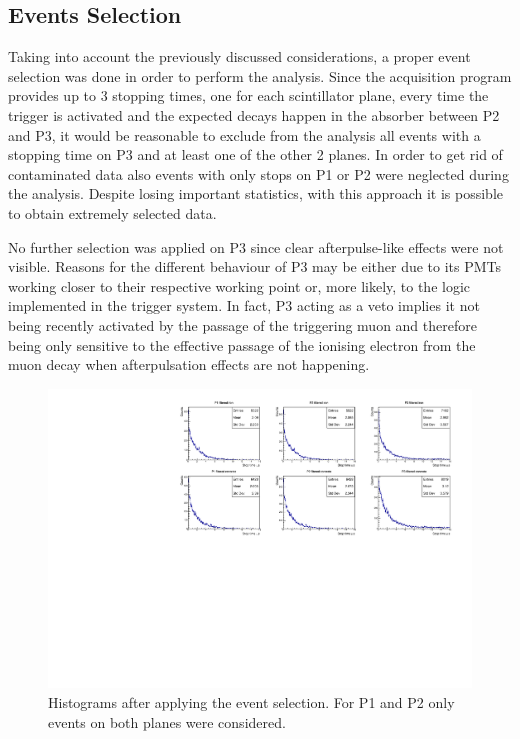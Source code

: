\documentclass[../main.tex]{subfiles}
\begin{document}
\subsection{Events Selection}

Taking into account the previously discussed considerations, a proper event selection was done in order to perform the analysis. Since the acquisition program provides up to 3 stopping times, one for each scintillator plane, every time the trigger is activated and the expected decays happen in the absorber between P2 and P3, it would be reasonable to exclude from the analysis all events with a stopping time on P3 and at least one of the other 2 planes. In order to get rid of contaminated data also events with only stops on P1 or P2 were neglected during the analysis. Despite losing important statistics, with this approach it is possible to obtain extremely selected data. 

No further selection was applied on P3 since clear afterpulse-like effects were not visible. Reasons for the different behaviour of P3 may be either due to its PMTs working closer to their respective working point or, more likely, to the logic implemented in the trigger system. In fact, P3 acting as a veto implies it not being recently activated by the passage of the triggering muon and therefore being only sensitive to the effective passage of the ionising electron from the muon decay when afterpulsation effects are not happening.

\begin{figure}[htb!]
    \centering
    \includegraphics[width=\linewidth]{images/filtered_histograms.pdf}
    \caption{Histograms after applying the event selection. For P1 and P2 only events on both planes were considered.}
    \label{fig:filteredhistograms}
\end{figure}
\end{document}
